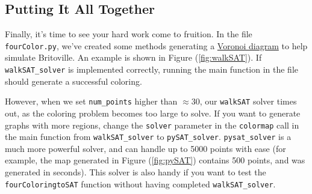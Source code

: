 \documentclass{article}
\begin{document}
\subsection*{Putting It All Together}
    Finally, it's time to see your hard work come to fruition. In the file \lstinline{fourColor.py}, we've created some methods generating a \href{https://en.wikipedia.org/wiki/Voronoi_diagram}{Voronoi diagram} to help simulate Britoville. An example is shown in Figure (\ref{fig:walkSAT}). If \lstinline{walkSAT_solver} is implemented correctly, running the main function in the file should generate a successful coloring.
    
    \vspace{2mm}
    However, when we set \lstinline{num_points} higher than $\approx 30$, our \lstinline{walkSAT} solver times out, as the coloring problem becomes too large to solve. If you want to generate graphs with more regions, change the \lstinline{solver} parameter in the \lstinline{colormap} call in the main function from \lstinline{walkSAT_solver} to \lstinline{pySAT_solver}. \lstinline{pysat_solver} is a much more powerful solver, and can handle up to 5000 points with ease (for example, the map generated in Figure (\ref{fig:pySAT}) contains 500 points, and was generated in seconds). This solver is also handy if you want to test the \lstinline{fourColoringtoSAT} function without having completed \lstinline{walkSAT_solver}.
\end{document}
